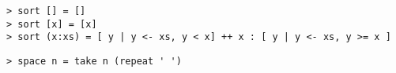 \begin{verbatim}
> sort [] = []
> sort [x] = [x]
> sort (x:xs) = [ y | y <- xs, y < x] ++ x : [ y | y <- xs, y >= x ]
\end{verbatim}
%
%
%
\begin{verbatim}
> space n = take n (repeat ' ')
\end{verbatim}
